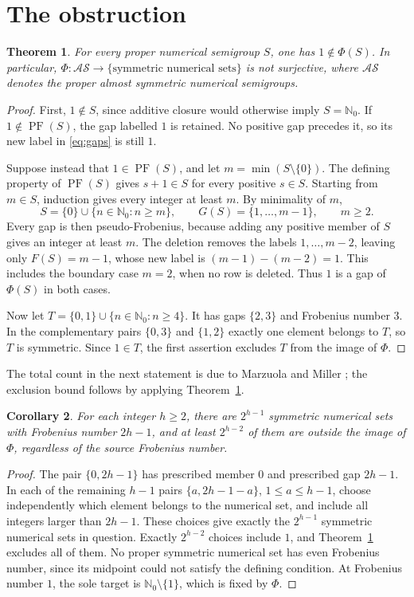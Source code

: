 \documentclass[11pt,a4paper]{article}
\newtheorem{theorem}{Theorem}
\newtheorem{corollary}[theorem]{Corollary}
\theoremstyle{definition}
\theoremstyle{remark}
\newcommand{\N}{\mathbb{N}_0}
\newcommand{\PF}{\operatorname{PF}}
\newcommand{\AS}{\mathcal{AS}}
\begin{document}
\section{The obstruction}
\begin{theorem}\label{thm:one}
For every proper numerical semigroup $S$, one has $1\notin\Phi(S)$.
In particular, $\Phi:\AS\longrightarrow\{\text{symmetric numerical sets}\}$
is not surjective, where $\AS$ denotes the proper almost symmetric
numerical semigroups.
\end{theorem}
\begin{proof}
First, $1\notin S$, since additive closure would otherwise imply $S=\N$.
If $1\notin\PF(S)$, the gap labelled $1$ is retained. No positive gap precedes
it, so its new label in \eqref{eq:gaps} is still $1$.

Suppose instead that $1\in\PF(S)$, and let $m=\min(S\setminus\{0\})$.
The defining property of $\PF(S)$ gives $s+1\in S$ for every positive
$s\in S$. Starting from $m\in S$, induction gives every integer at least $m$.
By minimality of $m$,
\[
 S=\{0\}\cup\{n\in\N:n\geq m\},\qquad
 G(S)=\{1,\ldots,m-1\},\qquad m\geq2.
\]
Every gap is then pseudo-Frobenius, because adding any positive member of $S$
gives an integer at least $m$. The deletion removes the labels
$1,\ldots,m-2$, leaving only $F(S)=m-1$, whose new label is
$(m-1)-(m-2)=1$. This includes the boundary case $m=2$, when no row is deleted.
Thus $1$ is a gap of $\Phi(S)$ in both cases.

Now let $T=\{0,1\}\cup\{n\in\N:n\geq4\}$.
It has gaps $\{2,3\}$ and Frobenius number $3$. In the complementary pairs
$\{0,3\}$ and $\{1,2\}$ exactly one element belongs to $T$, so $T$ is symmetric.
Since $1\in T$, the first assertion excludes $T$ from the image of $\Phi$.
\end{proof}

The total count in the next statement is due to Marzuola and Miller
\cite[p.~12]{MM}; the exclusion bound follows by applying Theorem~\ref{thm:one}.
\begin{corollary}\label{cor:half}
For each integer $h\geq2$, there are $2^{h-1}$ symmetric numerical sets
with Frobenius number $2h-1$, and at least $2^{h-2}$ of them are outside
the image of $\Phi$, regardless of the source Frobenius number.
\end{corollary}
\begin{proof}
The pair $\{0,2h-1\}$ has prescribed member $0$ and prescribed gap $2h-1$.
In each of the remaining $h-1$ pairs $\{a,2h-1-a\}$, $1\leq a\leq h-1$,
choose independently which element belongs to the numerical set, and include
all integers larger than $2h-1$. These choices give exactly the
$2^{h-1}$ symmetric numerical sets in question.
Exactly $2^{h-2}$ choices include $1$, and Theorem~\ref{thm:one} excludes all
of them. No proper symmetric numerical set has even Frobenius number, since
its midpoint could not satisfy the defining condition. At Frobenius number
$1$, the sole target is $\N\setminus\{1\}$, which is fixed by $\Phi$.
\end{proof}
\end{document}
